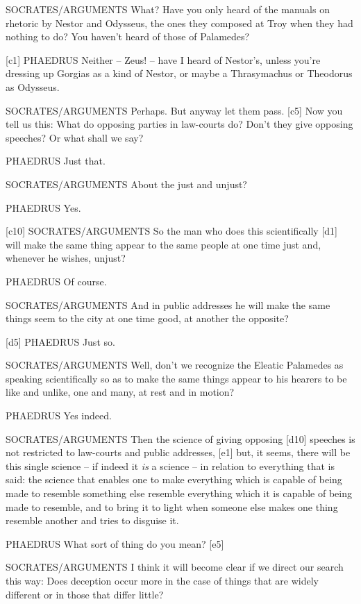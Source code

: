 SOCRATES/ARGUMENTS What? Have you only heard of the manuals on rhetoric
by Nestor and Odysseus, the ones they composed at Troy when they had
nothing to do? You haven't heard of those of
Palamedes?

{[}c1{]} PHAEDRUS Neither -- Zeus! -- have I heard of Nestor's, unless
you're dressing up Gorgias as a kind of Nestor, or maybe a Thrasymachus
or Theodorus as
Odysseus.

SOCRATES/ARGUMENTS Perhaps. But anyway let them pass. {[}c5{]} Now you
tell us this: What do opposing parties in law-courts do? Don't they give
opposing speeches? Or what shall we say?

PHAEDRUS Just that.

SOCRATES/ARGUMENTS About the just and unjust?

PHAEDRUS Yes.

{[}c10{]} SOCRATES/ARGUMENTS So the man who does this scientifically
{[}d1{]} will make the same thing appear to the same people at one time
just and, whenever he wishes, unjust?

PHAEDRUS Of course.

SOCRATES/ARGUMENTS And in public addresses he will make the same things
seem to the city at one time good, at another the
opposite?

{[}d5{]} PHAEDRUS Just so.

SOCRATES/ARGUMENTS Well, don't we recognize the Eleatic Palamedes as
speaking scientifically so as to make the same things appear to his
hearers to be like and unlike, one and many, at rest and in
motion?

PHAEDRUS Yes indeed.

SOCRATES/ARGUMENTS Then the science of giving opposing {[}d10{]}
speeches is not restricted to law-courts and public addresses, {[}e1{]}
but, it seems, there will be this single science -- if indeed it
{\em is} a science -- in relation to everything that is said: the
science that enables one to make everything which is capable of being
made to resemble something else resemble everything which it is capable
of being made to resemble, and to bring it to light when someone else
makes one thing resemble another and tries to disguise it.

PHAEDRUS What sort of thing do you mean? {[}e5{]}

SOCRATES/ARGUMENTS I think it will become clear if we direct our search
this way: Does deception occur more in the case of things that are
widely different or in those that differ little?


